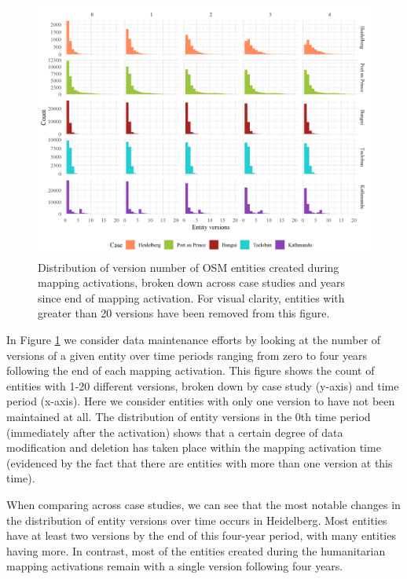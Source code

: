 \begin{figure} %
    \centering %
    \includegraphics[width = \textwidth]{Images/facetmaint.png} %
    \caption{Distribution of version number of OSM entities created during mapping activations, broken down across case studies and years since end of mapping activation. For visual clarity, entities with greater than 20 versions have been removed from this figure.} %
    \label{fig:dist} %
\end{figure}

In Figure \ref{fig:dist} we consider data maintenance efforts by looking at the number of versions of a given entity over time periods ranging from zero to four years following the end of each mapping activation. This figure shows the count of entities with 1-20 different versions, broken down by case study (y-axis) and time period (x-axis). Here we consider entities with only one version to have not been maintained at all. The distribution of entity versions in the 0th time period (immediately after the activation) shows that a certain degree of data modification and deletion has taken place within the mapping activation time (evidenced by the fact that there are entities with more than one version at this time). 

When comparing across case studies, we can see that the most notable changes in the distribution of entity versions over time occurs in Heidelberg. Most entities have at least two versions by the end of this four-year period, with many entities having more. In contrast, most of the entities created during the humanitarian mapping activations remain with a single version following four years. 

